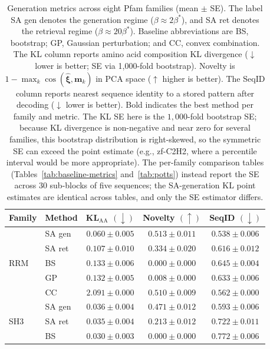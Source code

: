 \documentclass[10pt]{article}
\begin{document}
\begin{table}[ht]
\centering
\caption{Generation metrics across eight Pfam families (mean $\pm$ SE). The label SA gen denotes the generation regime ($\beta \approx 2\beta^*$), and SA ret denotes the retrieval regime ($\beta \approx 20\beta^*$). Baseline abbreviations are BS, bootstrap; GP, Gaussian perturbation; and CC, convex combination. The KL column reports amino acid composition KL divergence ($\downarrow$ lower is better; SE via 1{,}000-fold bootstrap). Novelty is $1 - \max_k\cos(\hat{\boldsymbol{\xi}}, \mathbf{m}_k)$ in PCA space ($\uparrow$ higher is better). The SeqID column reports nearest sequence identity to a stored pattern after decoding ($\downarrow$ lower is better). Bold indicates the best method per family and metric. The KL SE here is the $1{,}000$-fold bootstrap SE; because KL divergence is non-negative and near zero for several families, this bootstrap distribution is right-skewed, so the symmetric SE can exceed the point estimate (e.g., zf-C2H2, where a percentile interval would be more appropriate). The per-family comparison tables (Tables~\ref{tab:baseline-metrics} and~\ref{tab:potts}) instead report the SE across $30$ sub-blocks of five sequences; the SA-generation KL point estimates are identical across tables, and only the SE estimator differs.}
\label{tab:results}
\small
\begin{tabular}{@{}llccc@{}}
\toprule
Family & Method & KL$_{\mathrm{AA}}$ $(\downarrow)$ & Novelty $(\uparrow)$ & SeqID $(\downarrow)$ \\
\midrule
\multirow{5}{*}{RRM}
 & SA gen  & $\mathbf{0.060 \pm 0.005}$ & $\mathbf{0.513 \pm 0.011}$ & $\mathbf{0.538 \pm 0.006}$ \\
 & SA ret  & $0.107 \pm 0.010$ & $0.334 \pm 0.020$ & $0.616 \pm 0.012$ \\
 & BS      & $0.133 \pm 0.006$ & $0.000 \pm 0.000$ & $0.645 \pm 0.004$ \\
 & GP      & $0.132 \pm 0.005$ & $0.008 \pm 0.000$ & $0.633 \pm 0.006$ \\
 & CC      & $2.091 \pm 0.000$ & $0.510 \pm 0.009$ & $0.562 \pm 0.000$ \\
\midrule
\multirow{5}{*}{SH3}
 & SA gen  & $0.036 \pm 0.004$ & $\mathbf{0.471 \pm 0.012}$ & $\mathbf{0.593 \pm 0.006}$ \\
 & SA ret  & $0.035 \pm 0.004$ & $0.213 \pm 0.012$ & $0.722 \pm 0.011$ \\
 & BS      & $\mathbf{0.030 \pm 0.003}$ & $0.000 \pm 0.000$ & $0.772 \pm 0.006$ \\

\end{tabular}
\end{table}
\end{document}
